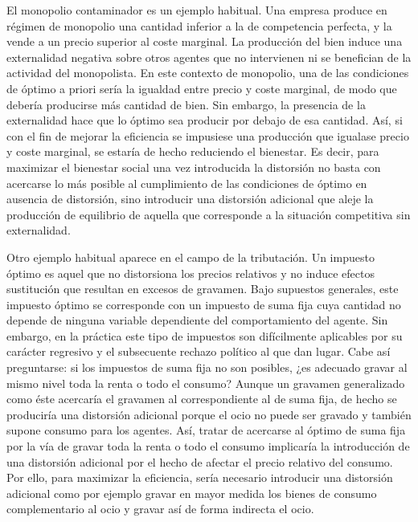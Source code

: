 \documentclass{nuevotema}
\begin{document}
El monopolio contaminador es un ejemplo habitual. Una empresa produce en régimen de monopolio una cantidad inferior a la de competencia perfecta, y la vende a un precio superior al coste marginal. La producción del bien induce una externalidad negativa sobre otros agentes que no intervienen ni se benefician de la actividad del monopolista. En este contexto de monopolio, una de las condiciones de óptimo a priori sería la igualdad entre precio y coste marginal, de modo que debería producirse más cantidad de bien. Sin embargo, la presencia de la externalidad hace que lo óptimo sea producir por debajo de esa cantidad. Así, si con el fin de mejorar la eficiencia se impusiese una producción que igualase precio y coste marginal, se estaría de hecho reduciendo el bienestar. Es decir, para maximizar el bienestar social una vez introducida la distorsión no basta con acercarse lo más posible al cumplimiento de las condiciones de óptimo en ausencia de distorsión, sino introducir una distorsión adicional que aleje la producción de equilibrio de aquella que corresponde a la situación competitiva sin externalidad. 

Otro ejemplo habitual aparece en el campo de la tributación. Un impuesto óptimo es aquel que no distorsiona los precios relativos y no induce efectos sustitución que resultan en excesos de gravamen. Bajo supuestos generales, este impuesto óptimo se corresponde con un impuesto de suma fija cuya cantidad no depende de ninguna variable dependiente del comportamiento del agente. Sin embargo, en la práctica este tipo de impuestos son difícilmente aplicables por su carácter regresivo y el subsecuente rechazo político al que dan lugar. Cabe así preguntarse: si los impuestos de suma fija no son posibles, ¿es adecuado gravar al mismo nivel toda la renta o todo el consumo? Aunque un gravamen generalizado como éste acercaría el gravamen al correspondiente al de suma fija, de hecho se produciría una distorsión adicional porque el ocio no puede ser gravado y también supone consumo para los agentes. Así, tratar de acercarse al óptimo de suma fija por la vía de gravar toda la renta o todo el consumo implicaría la introducción de una distorsión adicional por el hecho de afectar el precio relativo del consumo. Por ello, para maximizar la eficiencia, sería necesario introducir una distorsión adicional como por ejemplo gravar en mayor medida los bienes de consumo complementario al ocio y gravar así de forma indirecta el ocio.
\end{document}
